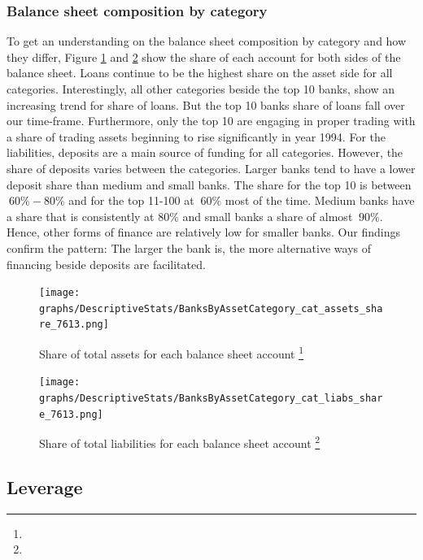 \documentclass[12pt, a4paper]{article} %
\begin{document}
\subsubsection{Balance sheet composition by category}

To get an understanding on the balance sheet composition by category and how they differ, Figure \ref{fig:catAssetsShare} and \ref{fig:catLiabShare} show the share of each account for both sides of the balance sheet. Loans continue to be the highest share on the asset side for all categories. Interestingly, all other categories beside the top 10 banks, show an increasing trend for share of loans. But the top 10 banks share of loans fall over our time-frame. Furthermore, only the top 10 are engaging in proper trading with a share of trading assets beginning to rise significantly in year 1994.
For the liabilities, deposits are a main source of funding for all categories. However, the share of deposits varies between the categories. Larger banks tend to have a lower deposit share than medium and small banks. The share for the top 10 is between $~60\%-80\%$ and for the top 11-100 at $~60\%$ most of the time. Medium banks have a share that is consistently at $80\%$ and small banks a share of almost $~90\%$. Hence, other forms of finance are relatively low for smaller banks. Our findings confirm the pattern: The larger the bank is, the more alternative ways of financing beside deposits are facilitated.


\begin{figure}[H]
\begin{minipage}{\textwidth}
\centering
\caption[1]{Share of total assets for each balance sheet account \footnote{} }
\texttt{[image: graphs/DescriptiveStats/BanksByAssetCategory\_cat\_assets\_share\_7613.png]}
\label{fig:catAssetsShare}
\end{minipage}
\end{figure}


\begin{figure}[H]
\begin{minipage}{\textwidth}
\centering
\caption[1]{Share of total liabilities for each balance sheet account \footnote{} }
\texttt{[image: graphs/DescriptiveStats/BanksByAssetCategory\_cat\_liabs\_share\_7613.png]}
\label{fig:catLiabShare}
\end{minipage}
\end{figure}

\newpage


\subsection{Leverage}
\end{document}
